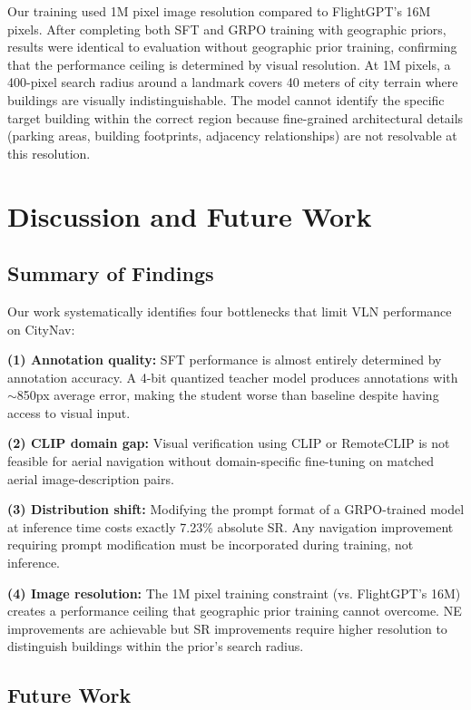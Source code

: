 \documentclass[conference]{IEEEtran}
\begin{document}
Our training used 1M pixel image resolution compared to FlightGPT's 16M pixels. After completing both SFT and GRPO training with geographic priors, results were identical to evaluation without geographic prior training, confirming that the performance ceiling is determined by visual resolution. At 1M pixels, a 400-pixel search radius around a landmark covers 40 meters of city terrain where buildings are visually indistinguishable. The model cannot identify the specific target building within the correct region because fine-grained architectural details (parking areas, building footprints, adjacency relationships) are not resolvable at this resolution.

\section{Discussion and Future Work}

\subsection{Summary of Findings}

Our work systematically identifies four bottlenecks that limit VLN performance on CityNav:

\textbf{(1) Annotation quality:} SFT performance is almost entirely determined by annotation accuracy. A 4-bit quantized teacher model produces annotations with $\sim$850px average error, making the student worse than baseline despite having access to visual input.

\textbf{(2) CLIP domain gap:} Visual verification using CLIP or RemoteCLIP is not feasible for aerial navigation without domain-specific fine-tuning on matched aerial image-description pairs.

\textbf{(3) Distribution shift:} Modifying the prompt format of a GRPO-trained model at inference time costs exactly 7.23\% absolute SR. Any navigation improvement requiring prompt modification must be incorporated during training, not inference.

\textbf{(4) Image resolution:} The 1M pixel training constraint (vs. FlightGPT's 16M) creates a performance ceiling that geographic prior training cannot overcome. NE improvements are achievable but SR improvements require higher resolution to distinguish buildings within the prior's search radius.

\subsection{Future Work}
\end{document}
